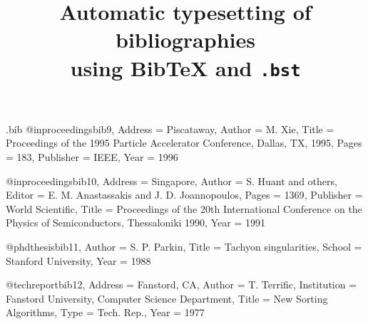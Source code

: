 \begin{filecontents*}{\jobname.bib}
@inproceedings{bib9,
    Address = {Piscataway},
    Author = {M. Xie},
    Title = {Proceedings of the 1995 {Particle} {Accelerator} {Conference}, {Dallas}, {TX}, 1995},
    Pages = {183},
    Publisher = {IEEE},
    Year = {1996}}

@inproceedings{bib10,
    Address = {Singapore},
    Author = {S. Huant and others},
    Editor = {E. M.  Anastassakis and J. D. Joannopoulos},
    Pages = {1369},
    Publisher = {World Scientific},
    Title = {Proceedings of the 20th {International} {Conference} on the {Physics} of {Semiconductors}, {Thessaloniki} 1990},
    Year = {1991}}

@phdthesis{bib11,
    Author = {S. P. Parkin},
    Title = {Tachyon singularities},
    School = {Stanford University},
    Year = {1988}}

@techreport{bib12,
    Address = {Fanstord, CA},
    Author = {T. Terrific},
    Institution = {Fanstord University, Computer Science Department},
    Title = {New Sorting Algorithms},
    Type = {Tech. Rep.},
    Year = {1977}}
\end{filecontents*}


\documentclass[mlq]{w-art}
\usepackage{times, courier}
\title{Automatic typesetting of bibliographies\\ using Bib\TeX{} and \texttt{\bstname.bst}}

\maketitle

\noindent Below you see an example for a bibliography generated by
Bib\TeX{} from the bibliographical database file\linebreak
\texttt{\jobname.bib}. One may use \texttt{\jobname.bib} as a template
for some real bibliography database. Please feel free to rename and
change this file (to use it, you have to erase its data content
anyway). It will be restored the next time you run the file
\texttt{\jobname.tex} through \LaTeX, which in turn typesets
\emph{this} document.

To produce the bibliography from the database you will have to run the
latter through Bib\TeX{} along with the bibstyle \texttt{\bstname.bst}
which as usual has to be somewhere in \TeX's search path. At the
command line (using \texttt{bash}, e.g.) one would just write
\begin{quote}
\verb+bibtex {<+\emph{filename}\verb+>}+
\end{quote}
where \texttt{<}\emph{filename}\texttt{>} is the name (w/o extension)
of the main document. However, most \TeX{} frontends have some
shortcut for that. Please see the documentation of your favourite
\TeX{} program for additional information.

Finally, to incorporate the bibliography into your document please use this code:
\begin{quote}
\verb+\verb+}+\\
\verb+\verb+>}+
\end{quote}

Here's the example:

\nocite{*}


